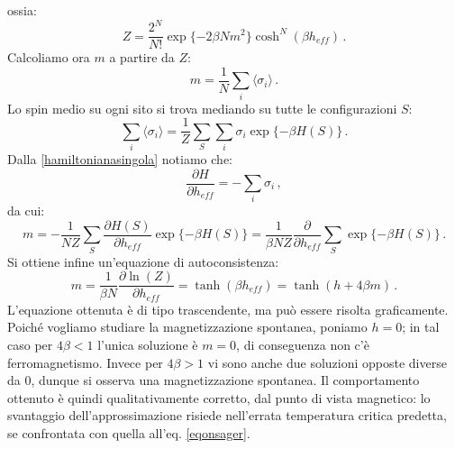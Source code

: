 \documentclass[Lau, noexaminfo, oneside]{sapthesis} %
\begin{document}
ossia:
\begin{equation}
Z = \frac{2^N}{N!} \exp \lbrace - 2 \beta  N m^2 \rbrace \cosh^N(\beta h_{eff}) \,.
\end{equation}
Calcoliamo ora $m$ a partire da $Z$:
\begin{equation}
m = \frac{1}{N} \sum_i \langle \sigma_i \rangle \,.
\end{equation}
Lo spin medio su ogni sito si trova mediando su tutte le configurazioni $S$:
\begin{equation}
\sum_i \langle \sigma_i \rangle = \frac{1}{Z} \sum_{S} \sum_i \sigma_i  \exp\lbrace-\beta H(S)\rbrace \,.
\end{equation}
Dalla \eqref{hamiltonianasingola} notiamo che:
\begin{equation}
\frac{\partial H}{\partial h_{eff}} = - \sum_i \sigma_i \,,
\end{equation}
da cui:
\begin{equation}
m = - \frac{1}{NZ} \sum_{S} \frac{\partial H(S)}{\partial h_{eff}} \exp\lbrace-\beta H(S)\rbrace = \frac{1}{\beta NZ} \frac{\partial}{\partial h_{eff}} \sum_{S} \exp\lbrace-\beta H(S)\rbrace \,.
\end{equation}
Si ottiene infine un'equazione di autoconsistenza:
\begin{equation}
m = \frac{1}{\beta N} \frac{\partial \ln(Z)}{\partial h_{eff}} = \tanh(\beta h_{eff})= \tanh(h+4\beta m) \,.
\end{equation}
L'equazione ottenuta è di tipo trascendente, ma può essere risolta graficamente.
Poiché vogliamo studiare la magnetizzazione spontanea, poniamo $h=0$; in tal caso per $4\beta<1$ l'unica soluzione è $m=0$, di conseguenza non c'è ferromagnetismo. Invece per $4\beta>1$ vi sono anche due soluzioni opposte diverse da 0, dunque si osserva una magnetizzazione spontanea.
Il comportamento ottenuto è quindi qualitativamente corretto, dal punto di vista magnetico: lo svantaggio dell'approssimazione risiede nell'errata temperatura critica predetta, se confrontata con quella all'eq. \eqref{eqonsager}.
\end{document}
